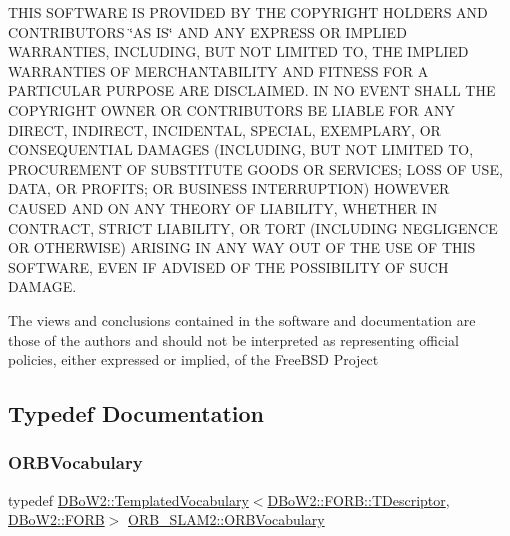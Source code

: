 T\+H\+IS S\+O\+F\+T\+W\+A\+RE IS P\+R\+O\+V\+I\+D\+ED BY T\+HE C\+O\+P\+Y\+R\+I\+G\+HT H\+O\+L\+D\+E\+RS A\+ND C\+O\+N\+T\+R\+I\+B\+U\+T\+O\+RS \char`\"{}\+A\+S I\+S\char`\"{} A\+ND A\+NY E\+X\+P\+R\+E\+SS OR I\+M\+P\+L\+I\+ED W\+A\+R\+R\+A\+N\+T\+I\+ES, I\+N\+C\+L\+U\+D\+I\+NG, B\+UT N\+OT L\+I\+M\+I\+T\+ED TO, T\+HE I\+M\+P\+L\+I\+ED W\+A\+R\+R\+A\+N\+T\+I\+ES OF M\+E\+R\+C\+H\+A\+N\+T\+A\+B\+I\+L\+I\+TY A\+ND F\+I\+T\+N\+E\+SS F\+OR A P\+A\+R\+T\+I\+C\+U\+L\+AR P\+U\+R\+P\+O\+SE A\+RE D\+I\+S\+C\+L\+A\+I\+M\+ED. IN NO E\+V\+E\+NT S\+H\+A\+LL T\+HE C\+O\+P\+Y\+R\+I\+G\+HT O\+W\+N\+ER OR C\+O\+N\+T\+R\+I\+B\+U\+T\+O\+RS BE L\+I\+A\+B\+LE F\+OR A\+NY D\+I\+R\+E\+CT, I\+N\+D\+I\+R\+E\+CT, I\+N\+C\+I\+D\+E\+N\+T\+AL, S\+P\+E\+C\+I\+AL, E\+X\+E\+M\+P\+L\+A\+RY, OR C\+O\+N\+S\+E\+Q\+U\+E\+N\+T\+I\+AL D\+A\+M\+A\+G\+ES (I\+N\+C\+L\+U\+D\+I\+NG, B\+UT N\+OT L\+I\+M\+I\+T\+ED TO, P\+R\+O\+C\+U\+R\+E\+M\+E\+NT OF S\+U\+B\+S\+T\+I\+T\+U\+TE G\+O\+O\+DS OR S\+E\+R\+V\+I\+C\+ES; L\+O\+SS OF U\+SE, D\+A\+TA, OR P\+R\+O\+F\+I\+TS; OR B\+U\+S\+I\+N\+E\+SS I\+N\+T\+E\+R\+R\+U\+P\+T\+I\+ON) H\+O\+W\+E\+V\+ER C\+A\+U\+S\+ED A\+ND ON A\+NY T\+H\+E\+O\+RY OF L\+I\+A\+B\+I\+L\+I\+TY, W\+H\+E\+T\+H\+ER IN C\+O\+N\+T\+R\+A\+CT, S\+T\+R\+I\+CT L\+I\+A\+B\+I\+L\+I\+TY, OR T\+O\+RT (I\+N\+C\+L\+U\+D\+I\+NG N\+E\+G\+L\+I\+G\+E\+N\+CE OR O\+T\+H\+E\+R\+W\+I\+SE) A\+R\+I\+S\+I\+NG IN A\+NY W\+AY O\+UT OF T\+HE U\+SE OF T\+H\+IS S\+O\+F\+T\+W\+A\+RE, E\+V\+EN IF A\+D\+V\+I\+S\+ED OF T\+HE P\+O\+S\+S\+I\+B\+I\+L\+I\+TY OF S\+U\+CH D\+A\+M\+A\+GE.

The views and conclusions contained in the software and documentation are those of the authors and should not be interpreted as representing official policies, either expressed or implied, of the Free\+B\+SD Project 

\subsection{Typedef Documentation}
\mbox{\label{namespace_o_r_b___s_l_a_m2_a2fafba714858cab1bb18d438e2e83c5d}} 
\subsubsection{\texorpdfstring{O\+R\+B\+Vocabulary}{ORBVocabulary}}
{\footnotesize\ttfamily typedef \mbox{\hyperlink{class_d_bo_w2_1_1_templated_vocabulary}{D\+Bo\+W2\+::\+Templated\+Vocabulary}}$<$\mbox{\hyperlink{class_d_bo_w2_1_1_f_o_r_b_aef9b966d0293836fab9f55f1799ce0ed}{D\+Bo\+W2\+::\+F\+O\+R\+B\+::\+T\+Descriptor}}, \mbox{\hyperlink{class_d_bo_w2_1_1_f_o_r_b}{D\+Bo\+W2\+::\+F\+O\+RB}}$>$ \mbox{\hyperlink{namespace_o_r_b___s_l_a_m2_a2fafba714858cab1bb18d438e2e83c5d}{O\+R\+B\+\_\+\+S\+L\+A\+M2\+::\+O\+R\+B\+Vocabulary}}}



